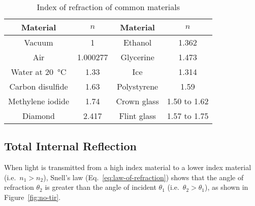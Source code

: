 \begin{table}[ht]
  \centering
  \begin{tabular}{c|c||c|c}
    \rowcolor{pink}
    \textbf{Material} & $n$ & \textbf{Material} & $n$\\ \hline
    Vacuum           & 1     & Ethanol     & 1.362 \\
    Air     & \num{1.000277} & Glycerine   & 1.473 \\
    Water at \SI{20}\celsius & 1.33 & Ice  & 1.314 \\
    Carbon disulfide & 1.63  & Polystyrene & 1.59 \\
    Methylene iodide & 1.74  & Crown glass & 1.50 to 1.62 \\
    Diamond          & 2.417 & Flint glass & 1.57 to 1.75
  \end{tabular}
  \caption{Index of refraction of common materials}
  \label{tabl:index-of-refraction}
\end{table}



\subsection{Total Internal Reflection}
When light is transmitted from a high index material to a lower index material
(i.e.\ $n_1>n_2$), Snell's law (Eq.~\ref{eq:law-of-refraction}) shows that the
angle of refraction $\theta_2$ is greater than the angle of incident $\theta_1$
(i.e.\ $\theta_2>\theta_1$), as shown in Figure~\ref{fig:no-tir}.

